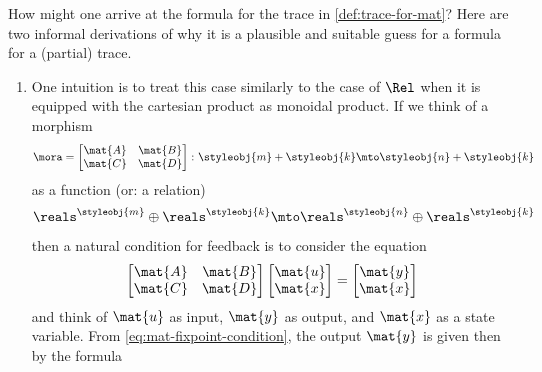 \begin{remark}
    How might one arrive at the formula for the trace in \cref{def:trace-for-mat}? Here are two informal derivations of why it is a plausible and suitable guess for a formula for a (partial) trace.

    \begin{enumerate}
        \item
              One intuition is to treat this case similarly to the case of $\Rel$ when it is equipped with the cartesian product as monoidal product.
              If we think of a morphism
              \begin{equation}
                  \mora = \begin{bmatrix}
                      \mat{A} & \mat{B} \\
                      \mat{C} & \mat{D}
                  \end{bmatrix}
                  \colon \styleobj{m} + \styleobj{k}  \mto \styleobj{n} + \styleobj{k}
              \end{equation}
              as a function (or: a relation)
              \begin{equation}
                  \reals^\styleobj{m} \oplus \reals^\styleobj{k}  \mto \reals^\styleobj{n} \oplus \reals^\styleobj{k}
              \end{equation}
              then a natural condition for feedback is to consider the equation
              \begin{equation} \label{eq:mat-fixpoint-condition}
                  \begin{bmatrix}
                      \mat{A} & \mat{B} \\
                      \mat{C} & \mat{D}
                  \end{bmatrix}
                  \begin{bmatrix}
                      \mat{u} \\
                      \mat{x}
                  \end{bmatrix}
                  =
                  \begin{bmatrix}
                      \mat{y} \\
                      \mat{x}
                  \end{bmatrix}
              \end{equation}
              and think of $\mat{u}$ as input, $\mat{y}$ as output, and $\mat{x}$ as a state variable.
              From \cref{eq:mat-fixpoint-condition}, the output $\mat{y}$ is given then by the formula

\end{enumerate}
\end{remark}
